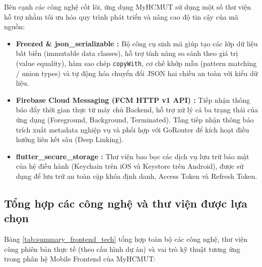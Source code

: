 Bên cạnh các công nghệ cốt lõi, ứng dụng MyHCMUT sử dụng một số thư viện hỗ trợ nhằm tối ưu hóa quy trình phát triển và nâng cao độ tin cậy của mã nguồn:

\begin{itemize}[leftmargin=*]
    \item \textbf{Freezed \& json\_serializable \cite{freezed_doc}:} Bộ công cụ sinh mã giúp tạo các lớp dữ liệu bất biến (immutable data classes), hỗ trợ tính năng so sánh theo giá trị (value equality), hàm sao chép \texttt{copyWith}, cơ chế khớp mẫu (pattern matching / union types) và tự động hóa chuyển đổi JSON hai chiều an toàn với kiểu dữ liệu.
    \item \textbf{Firebase Cloud Messaging (FCM HTTP v1 API) \cite{fcm_doc}:} Tiếp nhận thông báo đẩy thời gian thực từ máy chủ Backend, hỗ trợ xử lý cả ba trạng thái của ứng dụng (Foreground, Background, Terminated). Tầng tiếp nhận thông báo trích xuất metadata nghiệp vụ và phối hợp với GoRouter để kích hoạt điều hướng liên kết sâu (Deep Linking).
    \item \textbf{flutter\_secure\_storage \cite{android_keystore_doc,ios_keychain_doc}:} Thư viện bao bọc các dịch vụ lưu trữ bảo mật của hệ điều hành (Keychain trên iOS và Keystore trên Android), được sử dụng để lưu trữ an toàn cặp khóa định danh, Access Token và Refresh Token.
\end{itemize}

\subsection{Tổng hợp các công nghệ và thư viện được lựa chọn}
\label{subsec:summary_frontend_tech}

Bảng \ref{tab:summary_frontend_tech} tổng hợp toàn bộ các công nghệ, thư viện cùng phiên bản thực tế (theo cấu hình dự án) và vai trò kỹ thuật tương ứng trong phân hệ Mobile Frontend của MyHCMUT:

